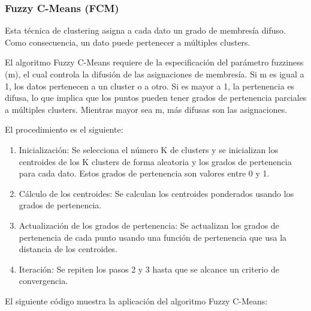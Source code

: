 \documentclass[a4paper, 12pt]{book}
\begin{document}
\subsubsection{Fuzzy C-Means (FCM)}
Esta técnica de clustering asigna a cada dato un grado de membresía difuso. Como consecuencia, un dato puede pertenecer a múltiples clusters.

El algoritmo Fuzzy C-Means requiere de la especificación del parámetro fuzziness (m), el cual controla la difusión de las asignaciones de membresía. Si m es igual a 1, los datos pertenecen a un cluster o a otro. Si es mayor a 1, la pertenencia es difusa, lo que implica que los puntos pueden tener grados de pertenencia parciales a múltiples clusters. Mientras mayor sea m, más difusas son las asignaciones.

El procedimiento es el siguiente:
\begin{enumerate}
	\item Inicialización: Se selecciona el número K de clusters y se inicializan los centroides de los K clusters de forma aleatoria y los grados de pertenencia para cada dato. Estos grados de pertenencia son valores entre 0 y 1.
	\item Cálculo de los centroides: Se calculan los centroides ponderados usando los grados de pertenencia.
	\item Actualización de los grados de pertenencia: Se actualizan los grados de pertenencia de cada punto usando una función de pertenencia que usa la distancia de los centroides.
	\item Iteración: Se repiten los pasos 2 y 3 hasta que se alcance un criterio de convergencia.
\end{enumerate}
El siguiente código muestra la aplicación del algoritmo Fuzzy C-Means:
\end{document}
